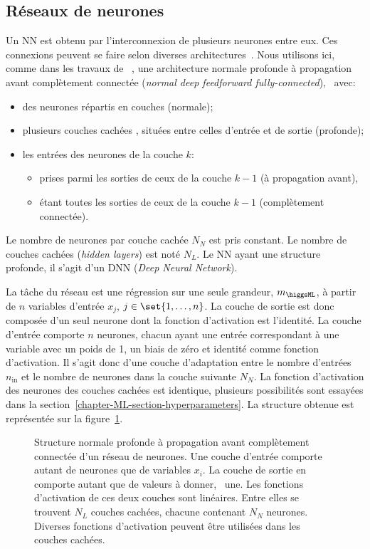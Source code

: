 \subsection{Réseaux de neurones}\label{chapter-ML-section-DNN-networks}
Un NN est obtenu par l'interconnexion de plusieurs neurones entre eux.
Ces connexions peuvent se faire selon diverses architectures~\cite{DNN}.
Nous utilisons ici,
comme dans les travaux de \citeauthor{BARTSCHI201929}~\cite{BARTSCHI201929},
une architecture
normale profonde à propagation avant complètement connectée (\emph{normal deep feedforward fully-connected}),
\ie\ avec:
\begin{itemize}
\item des neurones répartis en couches (normale);
\item plusieurs couches \og cachées \fg, situées entre celles d'entrée et de sortie (profonde);
\item les entrées des neurones de la couche $k$:
\begin{itemize}
\item prises parmi les sorties de ceux de la couche $k-1$ (à propagation avant),
\item étant toutes les sorties de ceux de la couche $k-1$ (complètement connectée).
\end{itemize}
\end{itemize}
Le nombre de neurones par couche cachée $N_N$ est pris constant.
Le nombre de couches cachées (\emph{hidden layers}) est noté $N_L$.
Le NN ayant une structure profonde, il s'agit d'un DNN (\emph{Deep Neural Network}).
\par
La tâche du réseau est une régression sur une seule grandeur, $m_{\higgsML}$, à partir de $n$ variables d'entrée $x_j$, $j\in\set{1,\ldots,n}$.
La couche de sortie est donc composée d'un seul neurone dont la fonction d'activation est l'identité.
La couche d'entrée comporte $n$ neurones, chacun ayant une entrée correspondant à une variable avec un poids de 1, un biais de zéro et identité comme fonction d'activation.
Il s'agit donc d'une couche d'adaptation entre le nombre d'entrées $n_\text{in}$ et le nombre de neurones dans la couche suivante $N_N$.
La fonction d'activation des neurones des couches cachées est identique, plusieurs possibilités sont essayées dans la section~\ref{chapter-ML-section-hyperparameters}.
La structure obtenue est représentée sur la figure~\ref{fig-neural_network_fr}.
\begin{figure}[h]
\centering

\caption[Structure d'un réseau de neurones.]{Structure normale profonde à propagation avant complètement connectée d'un réseau de neurones. Une couche d'entrée comporte autant de neurones que de variables $x_i$. La couche de sortie en comporte autant que de valeurs à donner, \ie\ une. Les fonctions d'activation de ces deux couches sont linéaires. Entre elles se trouvent $N_L$ couches cachées, chacune contenant $N_N$ neurones. Diverses fonctions d'activation peuvent être utilisées dans les couches cachées.}
\label{fig-neural_network_fr}
\end{figure}